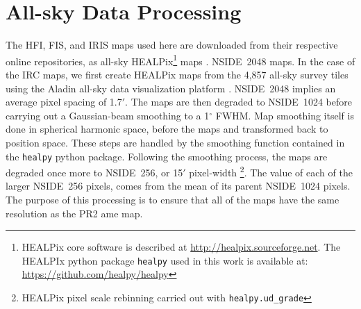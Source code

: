   \section{All-sky Data Processing}

        The HFI, FIS, and IRIS maps used here are downloaded from their respective online repositories, as all-sky HEALPix\footnote{HEALPix core software is described at \url{http://healpix.sourceforge.net}. The HEALPIx python package {\tt healpy} used in this work is available at: \url{https://github.com/healpy/healpy}} maps \citep{gorski05}. NSIDE~2048 maps. In the case of the IRC maps, we first create HEALPix maps from the 4,857 all-sky survey tiles using the Aladin all-sky data visualization platform \citep{bonnarel00}. NSIDE~2048 implies an average pixel spacing of 1.7$'$. The maps are then degraded to NSIDE~1024 before carrying out a Gaussian-beam smoothing to a 1$^{\circ}$ FWHM. Map smoothing itself is done in spherical harmonic space, before the maps and transformed back to position space. These steps are handled by the smoothing function contained in the {\tt healpy} python package. Following the smoothing process, the maps are degraded once more to NSIDE~256, or 15$'$ pixel-width \footnote{HEALPix pixel scale rebinning carried out with {\tt healpy.ud\_grade}}. The value of each of the larger NSIDE~256 pixels, comes from the mean of its parent NSIDE~1024 pixels. The purpose of this processing is to ensure that all of the maps have the same resolution as the PR2 \acrshort{ame} map.
